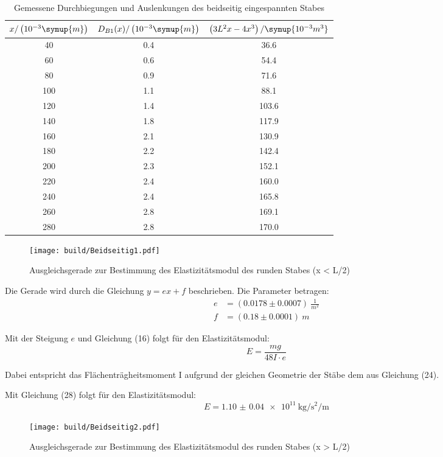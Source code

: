 \begin{table}[H]
  \centering
  \caption{Gemessene Durchbiegungen und Auslenkungen des beidseitig eingespannten Stabes}
  \label{tab:beidseitig}
  \begin{tabular}{c c c}
    \toprule
    $x/\left(10^{-3}\symup{m}\right)$ & $D_{B1}(x)/\left(10^{-3}\symup{m}\right)$ & $\left(3L^2x-4x^3\right)/\symup{10^{-3}m^3}$ \\
    \midrule
     40 & 0.4 &  36.6 \\
     60 & 0.6 &  54.4 \\
     80 & 0.9 &  71.6 \\
    100 & 1.1 &  88.1 \\
    120 & 1.4 & 103.6 \\
    140 & 1.8 & 117.9 \\
    160 & 2.1 & 130.9 \\
    180 & 2.2 & 142.4 \\
    200 & 2.3 & 152.1 \\
    220 & 2.4 & 160.0 \\
    240 & 2.4 & 165.8 \\
    260 & 2.8 & 169.1 \\
    280 & 2.8 & 170.0 \\
    \bottomrule
  \end{tabular}
\end{table}

\begin{figure}[H]
  \centering
  \texttt{[image: build/Beidseitig1.pdf]}
  \caption{Ausgleichsgerade zur Bestimmung des Elastizitätsmodul des runden Stabes (x < L/2)}
  \label{fig:Elastizitätsmodul des runden Stabes}
\end{figure}

Die Gerade wird durch die Gleichung $y = ex + f$ beschrieben. Die Parameter betragen:
\begin{align*}
  e &= (0.0178 \pm 0.0007) \: \frac{1}{m^2} \\
  f &= (0.18  \pm 0.0001) \: m
\end{align*}

Mit der Steigung $e$ und Gleichung (16) folgt für den Elastizitätsmodul:
\begin{equation}
  E = \frac{mg}{48I \cdot e}
\end{equation}

Dabei entspricht das Flächenträgheitsmoment I aufgrund der gleichen Geometrie der Stäbe
dem aus Gleichung (24).

Mit Gleichung (28) folgt für den Elastizitätsmodul:
\begin{equation}
  E = \SI{1.10(4)e11}{\kilo\gram\per\second\squared\per\meter}
\end{equation}

\begin{figure}[H]
  \centering
  \texttt{[image: build/Beidseitig2.pdf]}
  \caption{Ausgleichsgerade zur Bestimmung des Elastizitätsmodul des runden Stabes (x > L/2)}
  \label{fig:Elastizitätsmodul des runden Stabes1}
\end{figure}
